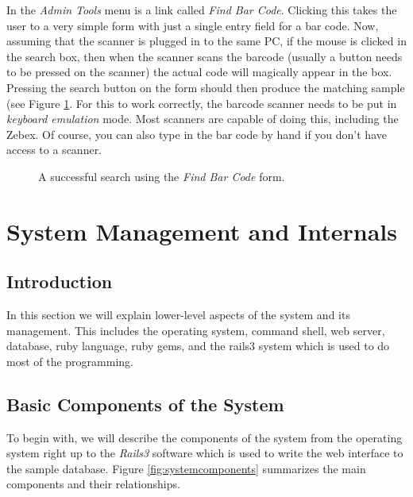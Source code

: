 \documentclass[12pt,twoside]{article}
\begin{document}
In the \emph{Admin Tools} menu is a link called \emph{Find Bar Code}.
Clicking this takes the user to a very simple form with just a single
entry field for a bar code. Now, assuming that the scanner is plugged in to
the same PC, if the mouse is clicked in the search box, then when the
scanner scans the barcode (usually a button needs to be pressed on the 
scanner) the actual code will magically appear in the box. Pressing
the search button on the form should then produce the matching sample
(see Figure \ref{fig:barcodeform}. 
For this to work correctly, the
barcode scanner needs to be put in \emph{keyboard emulation} mode.
Most scanners are capable of doing this, including the Zebex.
Of course, you can also type in the bar code by hand if you don't
have access to a scanner.

\begin{figure}[!h]
\begin{center}
\caption{A successful search using the \emph{Find Bar Code} form.
\label{fig:barcodeform}}
\end{center}
\end{figure}

\section{System Management and Internals}
\subsection{Introduction}
In this section we will explain lower-level aspects of the system
and its management.
This includes the operating system, command shell, web server, 
database, ruby language, ruby gems, and the rails3 system which is
used to do most of the programming.

\subsection{Basic Components of the System}
To begin with, we will describe the components of the system from the
operating system right up to the \emph{Rails3} software which is used
to write the web interface to the sample database.
Figure \ref{fig:systemcomponents} summarizes the main components and
their relationships.
\end{document}

